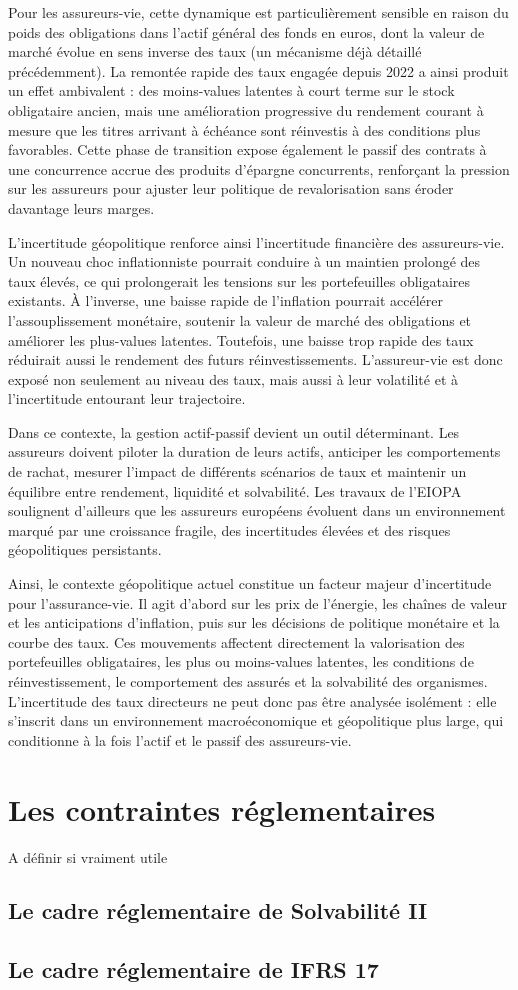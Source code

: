 Pour les assureurs-vie, cette dynamique est particulièrement sensible en raison du poids des obligations dans l'actif général des fonds en euros, dont la valeur de marché évolue en sens inverse des taux (un mécanisme déjà détaillé précédemment). La remontée rapide des taux engagée depuis 2022 a ainsi produit un effet ambivalent : des moins-values latentes à court terme sur le stock obligataire ancien, mais une amélioration progressive du rendement courant à mesure que les titres arrivant à échéance sont réinvestis à des conditions plus favorables. Cette phase de transition expose également le passif des contrats à une concurrence accrue des produits d'épargne concurrents, renforçant la pression sur les assureurs pour ajuster leur politique de revalorisation sans éroder davantage leurs marges.

L'incertitude géopolitique renforce ainsi l'incertitude financière des assureurs-vie. Un nouveau choc inflationniste pourrait conduire à un maintien prolongé des taux élevés, ce qui prolongerait les tensions sur les portefeuilles obligataires existants. À l'inverse, une baisse rapide de l'inflation pourrait accélérer l'assouplissement monétaire, soutenir la valeur de marché des obligations et améliorer les plus-values latentes. Toutefois, une baisse trop rapide des taux réduirait aussi le rendement des futurs réinvestissements. L'assureur-vie est donc exposé non seulement au niveau des taux, mais aussi à leur volatilité et à l'incertitude entourant leur trajectoire.

Dans ce contexte, la gestion actif-passif devient un outil déterminant. Les assureurs doivent piloter la duration de leurs actifs, anticiper les comportements de rachat, mesurer l'impact de différents scénarios de taux et maintenir un équilibre entre rendement, liquidité et solvabilité. Les travaux de l'EIOPA soulignent d'ailleurs que les assureurs européens évoluent dans un environnement marqué par une croissance fragile, des incertitudes élevées et des risques géopolitiques persistants.

Ainsi, le contexte géopolitique actuel constitue un facteur majeur d'incertitude pour l'assurance-vie. Il agit d'abord sur les prix de l'énergie, les chaînes de valeur et les anticipations d'inflation, puis sur les décisions de politique monétaire et la courbe des taux. Ces mouvements affectent directement la valorisation des portefeuilles obligataires, les plus ou moins-values latentes, les conditions de réinvestissement, le comportement des assurés et la solvabilité des organismes. L'incertitude des taux directeurs ne peut donc pas être analysée isolément : elle s'inscrit dans un environnement macroéconomique et géopolitique plus large, qui conditionne à la fois l'actif et le passif des assureurs-vie.
\section{Les contraintes réglementaires}
A définir si vraiment utile
\subsection{Le cadre réglementaire de Solvabilité II}
\subsection{Le cadre réglementaire de IFRS 17}